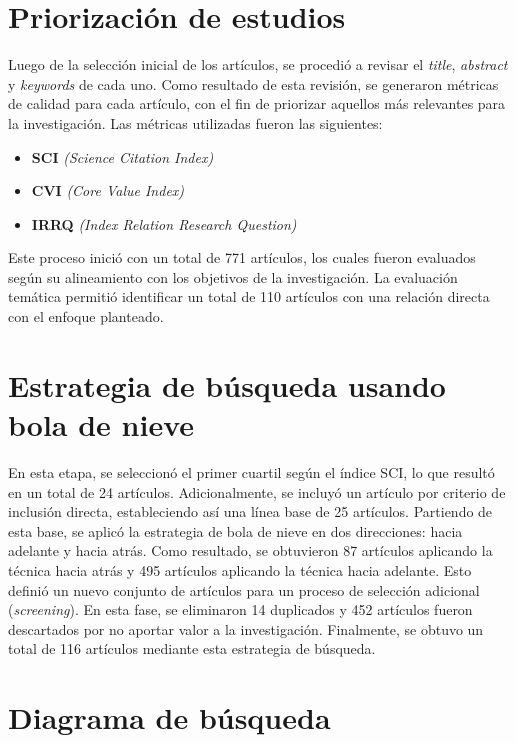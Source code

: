 \section{Priorización de estudios}\label{sec:priorizacionEstudios}
\noindent
Luego de la selección inicial de los artículos, se procedió a revisar el \textit{title}, \textit{abstract} y \textit{keywords} de cada uno. Como resultado de esta revisión, se generaron métricas de calidad para cada artículo, con el fin de priorizar aquellos más relevantes para la investigación. Las métricas utilizadas fueron las siguientes:

\begin{itemize}
	\item \textbf{SCI} \textit{(Science Citation Index)}
	\item \textbf{CVI} \textit{(Core Value Index)}
	\item \textbf{IRRQ} \textit{(Index Relation Research Question)}
\end{itemize}
\noindent
Este proceso inició con un total de 771 artículos, los cuales fueron evaluados según su alineamiento con los objetivos de la investigación. La evaluación temática permitió identificar un total de 110 artículos con una relación directa con el enfoque planteado.

\section{Estrategia de búsqueda usando bola de nieve}\label{sec:bolaDeNieve}
\noindent
En esta etapa, se seleccionó el primer cuartil según el índice SCI, lo que resultó en un total de 24 artículos. Adicionalmente, se incluyó un artículo por criterio de inclusión directa, estableciendo así una línea base de 25 artículos.
Partiendo de esta base, se aplicó la estrategia de bola de nieve en dos direcciones: hacia adelante y hacia atrás. Como resultado, se obtuvieron 87 artículos aplicando la técnica hacia atrás y 495 artículos aplicando la técnica hacia adelante.
Esto definió un nuevo conjunto de artículos para un proceso de selección adicional (\textit{screening}). En esta fase, se eliminaron 14 duplicados y 452 artículos fueron descartados por no aportar valor a la investigación.
Finalmente, se obtuvo un total de 116 artículos mediante esta estrategia de búsqueda.

\section{Diagrama de búsqueda}\label{sec:diagramaBusqueda}

